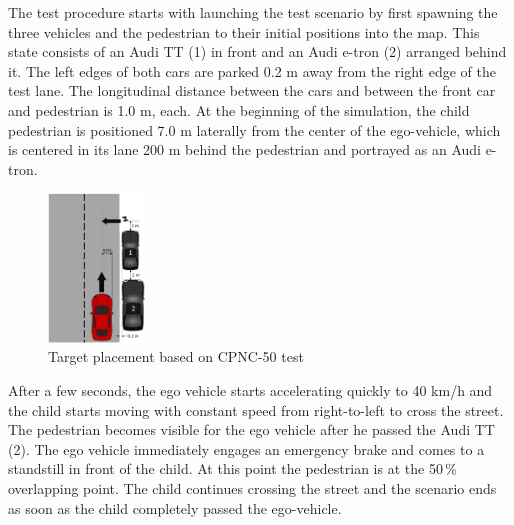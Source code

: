 The test procedure starts with launching the test scenario by first spawning the three vehicles and the pedestrian to their initial positions into the map. This state consists of an Audi TT (1) in front and an Audi e-tron (2) arranged behind it. The left edges of both cars are parked 0.2 m away from the right edge of the test lane. The longitudinal distance between the cars and between the front car and pedestrian is 1.0 m, each. At the beginning of the simulation, the child pedestrian is positioned 7.0 m laterally from the center of the ego-vehicle, which is centered in its lane 200 m behind the pedestrian and portrayed as an Audi e-tron.

\begin{figure}[htbp]
	\centering
	\includegraphics[width=0.23\textwidth]{images/Target_Placement_test_scenario.png}
	\caption{Target placement based on CPNC-50 test \cite{Protocoll}}
	\label{fig:coordination}
\end{figure}


After a few seconds, the ego vehicle starts accelerating quickly to 40 km/h and the child starts moving with constant speed from right-to-left to cross the street. The pedestrian becomes visible for the ego vehicle after he passed the Audi TT (2). The ego vehicle immediately engages an emergency brake and comes to a standstill in front of the child. At this point the pedestrian is at the 50\,\% overlapping point. The child continues crossing the street and the scenario ends as soon as the child completely passed the ego-vehicle.


